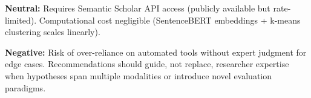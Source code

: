 \textbf{Neutral:} Requires Semantic Scholar API access (publicly available but rate-limited). Computational cost negligible (SentenceBERT embeddings + k-means clustering scales linearly).

\textbf{Negative:} Risk of over-reliance on automated tools without expert judgment for edge cases. Recommendations should guide, not replace, researcher expertise when hypotheses span multiple modalities or introduce novel evaluation paradigms.
